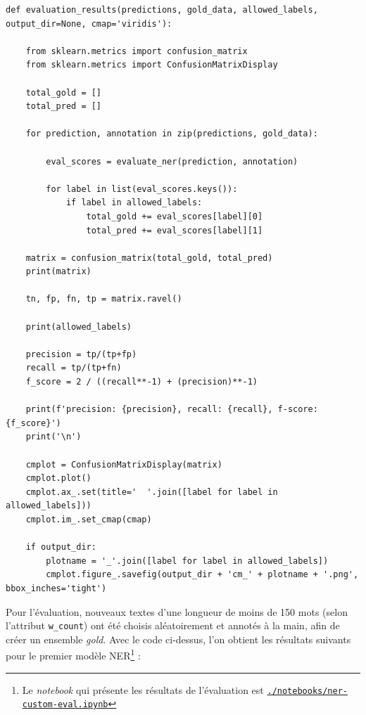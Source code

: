 \documentclass[a4paper,twoside,12pt]{article}
\begin{document}
\begin{verbatim}
def evaluation_results(predictions, gold_data, allowed_labels, output_dir=None, cmap='viridis'): 
    
    from sklearn.metrics import confusion_matrix
    from sklearn.metrics import ConfusionMatrixDisplay
    
    total_gold = []
    total_pred = []
    
    for prediction, annotation in zip(predictions, gold_data):
        
        eval_scores = evaluate_ner(prediction, annotation)
        
        for label in list(eval_scores.keys()):
            if label in allowed_labels:
                total_gold += eval_scores[label][0]
                total_pred += eval_scores[label][1]
            
    matrix = confusion_matrix(total_gold, total_pred)
    print(matrix)
    
    tn, fp, fn, tp = matrix.ravel()

    print(allowed_labels)
    
    precision = tp/(tp+fp)
    recall = tp/(tp+fn)
    f_score = 2 / ((recall**-1) + (precision)**-1)
    
    print(f'precision: {precision}, recall: {recall}, f-score: {f_score}')
    print('\n')
    
    cmplot = ConfusionMatrixDisplay(matrix)
    cmplot.plot()
    cmplot.ax_.set(title='  '.join([label for label in allowed_labels]))
    cmplot.im_.set_cmap(cmap)
    
    if output_dir:
        plotname = '_'.join([label for label in allowed_labels])
        cmplot.figure_.savefig(output_dir + 'cm_' + plotname + '.png', bbox_inches='tight')
\end{verbatim}

Pour l'évaluation, nouveaux textes d'une longueur de moins de 150 mots (selon l'attribut \texttt{w\_count}) ont été choisis aléatoirement et annotés à la main, afin de créer un ensemble \textit{gold}. Avec le code ci-dessus, l'on obtient les résultats suivants pour le premier modèle NER\footnote{Le \textit{notebook} qui présente les résultats de l'évaluation est \href{https://github.com/krkryger/clim-dist/blob/main/notebooks/ner-custom-eval.ipynb}{\texttt{./notebooks/ner-custom-eval.ipynb}}} :
\end{document}

